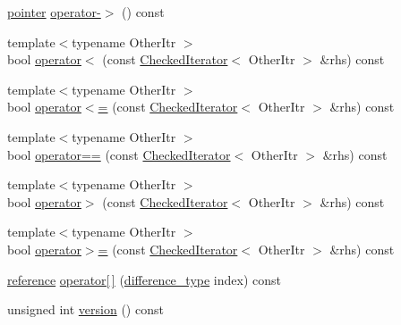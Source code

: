 \begin{DoxyCompactItemize}
\item 
\mbox{\hyperlink{classstanfordcpplib_1_1collections_1_1CheckedIterator_aec43e3dd6c5819f52268692c4f174d89}{pointer}} \mbox{\hyperlink{classstanfordcpplib_1_1collections_1_1CheckedIterator_aef4e7d4e0fa56e9f7509c555f73d24d2}{operator-\/$>$}} () const
\item 
{\footnotesize template$<$typename Other\+Itr $>$ }\\bool \mbox{\hyperlink{classstanfordcpplib_1_1collections_1_1CheckedIterator_a57f5086985c6d4cfb821be8c75a227d6}{operator$<$}} (const \mbox{\hyperlink{classstanfordcpplib_1_1collections_1_1CheckedIterator}{Checked\+Iterator}}$<$ Other\+Itr $>$ \&rhs) const
\item 
{\footnotesize template$<$typename Other\+Itr $>$ }\\bool \mbox{\hyperlink{classstanfordcpplib_1_1collections_1_1CheckedIterator_a54314d92671a7b611ad9939f36c2ef21}{operator$<$=}} (const \mbox{\hyperlink{classstanfordcpplib_1_1collections_1_1CheckedIterator}{Checked\+Iterator}}$<$ Other\+Itr $>$ \&rhs) const
\item 
{\footnotesize template$<$typename Other\+Itr $>$ }\\bool \mbox{\hyperlink{classstanfordcpplib_1_1collections_1_1CheckedIterator_a1cf4895aaf651fca43167c7d09a76154}{operator==}} (const \mbox{\hyperlink{classstanfordcpplib_1_1collections_1_1CheckedIterator}{Checked\+Iterator}}$<$ Other\+Itr $>$ \&rhs) const
\item 
{\footnotesize template$<$typename Other\+Itr $>$ }\\bool \mbox{\hyperlink{classstanfordcpplib_1_1collections_1_1CheckedIterator_a2fffb26a69cbdd79a03d59a08bdd69ba}{operator$>$}} (const \mbox{\hyperlink{classstanfordcpplib_1_1collections_1_1CheckedIterator}{Checked\+Iterator}}$<$ Other\+Itr $>$ \&rhs) const
\item 
{\footnotesize template$<$typename Other\+Itr $>$ }\\bool \mbox{\hyperlink{classstanfordcpplib_1_1collections_1_1CheckedIterator_a1e2a700c7dc486b8c1b748844afa02a0}{operator$>$=}} (const \mbox{\hyperlink{classstanfordcpplib_1_1collections_1_1CheckedIterator}{Checked\+Iterator}}$<$ Other\+Itr $>$ \&rhs) const
\item 
\mbox{\hyperlink{classstanfordcpplib_1_1collections_1_1CheckedIterator_a57d818f6bd24dee2a8803cb3be635373}{reference}} \mbox{\hyperlink{classstanfordcpplib_1_1collections_1_1CheckedIterator_af8504b1545623760c8780ee24aa03d06}{operator\mbox{[}$\,$\mbox{]}}} (\mbox{\hyperlink{classstanfordcpplib_1_1collections_1_1CheckedIterator_ad050e8e82b0962bb9ebd0e7c23b436ac}{difference\+\_\+type}} index) const
\item 
unsigned int \mbox{\hyperlink{classstanfordcpplib_1_1collections_1_1CheckedIterator_a0aa696ccb72cbf928535d6b646bac1aa}{version}} () const
\end{DoxyCompactItemize}


